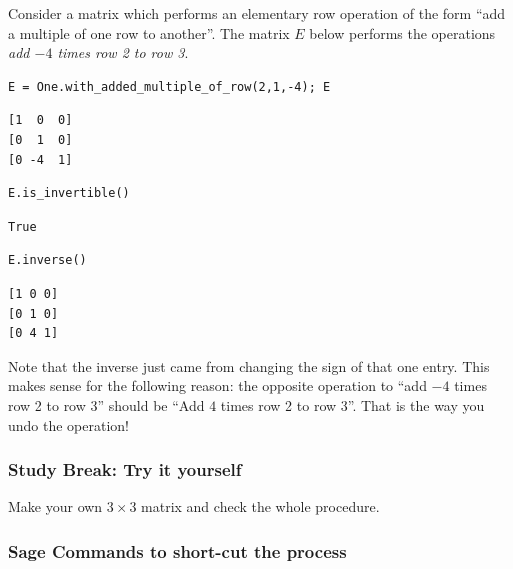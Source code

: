 \documentclass[10pt,]{book}
\theoremstyle{plain}
\theoremstyle{definition}
\numberwithin{equation}{section}
\begin{document}
      Consider a matrix which performs an elementary row operation of the
      form ``add a multiple of one row to another''. The matrix \(E\)
      below performs the operations \emph{add \(-4\) times row 2 to row 3}.
\begin{lstlisting}[style=sageinput]
E = One.with_added_multiple_of_row(2,1,-4); E
\end{lstlisting}
\begin{lstlisting}[style=sageoutput]
[1  0  0]
[0  1  0]
[0 -4  1]
\end{lstlisting}
\begin{lstlisting}[style=sageinput]
E.is_invertible()
\end{lstlisting}
\begin{lstlisting}[style=sageoutput]
True
\end{lstlisting}
\begin{lstlisting}[style=sageinput]
E.inverse()
\end{lstlisting}
\begin{lstlisting}[style=sageoutput]
[1 0 0]
[0 1 0]
[0 4 1]
\end{lstlisting}
\par

      Note that the inverse just came from changing the sign of that one entry.
      This makes sense for the following reason: the opposite operation to
      ``add \(-4\) times row 2 to row 3'' should be ``Add \(4\) times
      row 2 to row 3''. That is the way you undo the operation!
\typeout{************************************************}
\typeout{************************************************}
\subsubsection[Study Break: Try it yourself]{Study Break: Try it yourself}\label{subsubsection-25}

        Make your own \(3\times 3\) matrix and check the whole procedure.
\typeout{************************************************}
\typeout{************************************************}
\subsubsection[Sage Commands to short-cut the process]{Sage Commands to short-cut the process}\label{subsubsection-26}
\end{document}

